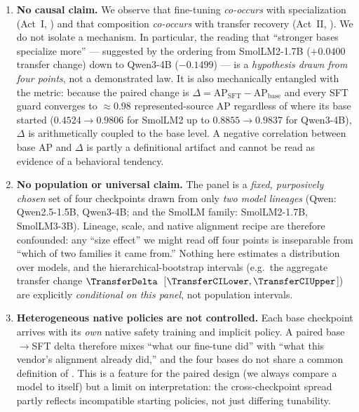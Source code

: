 \begin{enumerate}[leftmargin=1.6em,itemsep=2pt]
  \item \textbf{No causal claim.} We observe that fine-tuning \emph{co-occurs} with specialization (Act~I, ) and that composition \emph{co-occurs} with transfer recovery (Act~II, ). We do not isolate a mechanism. In particular, the reading that ``stronger bases specialize more'' --- suggested by the ordering from SmolLM2-1.7B ($+0.0400$ transfer change) down to Qwen3-4B ($-0.1499$) --- is a \emph{hypothesis drawn from four points}, not a demonstrated law. It is also mechanically entangled with the metric: because the paired change is $\Delta=\mathrm{AP}_{\text{SFT}}-\mathrm{AP}_{\text{base}}$ and every SFT guard converges to $\approx0.98$ represented-source AP regardless of where its base started ($0.4524{\to}0.9806$ for SmolLM2 up to $0.8855{\to}0.9837$ for Qwen3-4B), $\Delta$ is arithmetically coupled to the base level. A negative correlation between base AP and $\Delta$ is partly a definitional artifact and cannot be read as evidence of a behavioral tendency.

  \item \textbf{No population or universal claim.} The panel is a \emph{fixed, purposively chosen} set of four checkpoints drawn from only \emph{two model lineages} (Qwen: Qwen2.5-1.5B, Qwen3-4B; and the SmolLM family: SmolLM2-1.7B, SmolLM3-3B). Lineage, scale, and native alignment recipe are therefore confounded: any ``size effect'' we might read off four points is inseparable from ``which of two families it came from.'' Nothing here estimates a distribution over models, and the hierarchical-bootstrap intervals (e.g.\ the aggregate transfer change $\TransferDelta$~[$\TransferCILower,\TransferCIUpper$]) are explicitly \emph{conditional on this panel}, not population intervals.

  \item \textbf{Heterogeneous native policies are not controlled.} Each base checkpoint arrives with its \emph{own} native safety training and implicit policy. A paired base$\to$SFT delta therefore mixes ``what our fine-tune did'' with ``what this vendor's alignment already did,'' and the four bases do not share a common definition of . This is a feature for the paired design (we always compare a model to itself) but a limit on interpretation: the cross-checkpoint spread partly reflects incompatible starting policies, not just differing tunability.


\end{enumerate}
